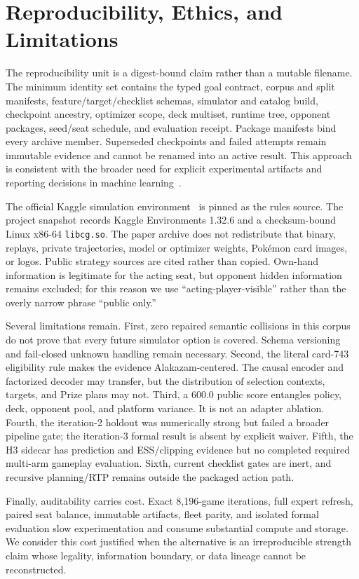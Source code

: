 \section{Reproducibility, Ethics, and Limitations}

The reproducibility unit is a digest-bound claim rather than a mutable filename.
The minimum identity set contains the typed goal contract, corpus and split
manifests, feature/target/checklist schemas, simulator and catalog build,
checkpoint ancestry, optimizer scope, deck multiset, runtime tree, opponent
packages, seed/seat schedule, and evaluation receipt. Package manifests bind
every archive member. Superseded checkpoints and failed attempts remain
immutable evidence and cannot be renamed into an active result. This approach
is consistent with the broader need for explicit experimental artifacts and
reporting decisions in machine learning~\cite{pineau2021improving}.

The official Kaggle simulation environment~\cite{kaggleSimulationOverview}
is pinned as the rules source. The project snapshot records Kaggle Environments
1.32.6 and a checksum-bound Linux x86-64 \texttt{libcg.so}. The paper archive
does not redistribute that binary, replays, private trajectories, model or
optimizer weights, Pok\'emon card images, or logos. Public strategy sources are
cited rather than copied. Own-hand information is legitimate for the acting
seat, but opponent hidden information remains excluded; for this reason we use
``acting-player-visible'' rather than the overly narrow phrase ``public only.''

Several limitations remain. First, zero repaired semantic collisions in this
corpus do not prove that every future simulator option is covered. Schema
versioning and fail-closed unknown handling remain necessary. Second, the
literal card-743 eligibility rule makes the evidence Alakazam-centered. The
causal encoder and factorized decoder may transfer, but the distribution of
selection contexts, targets, and Prize plans may not. Third, a 600.0 public
score entangles policy, deck, opponent pool, and platform variance. It is not
an adapter ablation. Fourth, the iteration-2 holdout was numerically strong but
failed a broader pipeline gate; the iteration-3 formal result is absent by
explicit waiver. Fifth, the H3 sidecar has prediction and ESS/clipping evidence
but no completed required multi-arm gameplay evaluation. Sixth, current
checklist gates are inert, and recursive planning/RTP remains outside the
packaged action path.

Finally, auditability carries cost. Exact 8,196-game iterations, full expert
refresh, paired seat balance, immutable artifacts, fleet parity, and isolated
formal evaluation slow experimentation and consume substantial compute and
storage. We consider this cost justified when the alternative is an
irreproducible strength claim whose legality, information boundary, or data
lineage cannot be reconstructed.
